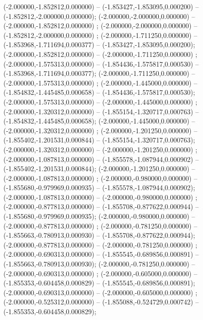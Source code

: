  (-2.000000,-1.852812,0.000000) -- (-1.853427,-1.853095,0.000200) -- (-1.852812,-2.000000,0.000000);
 (-2.000000,-2.000000,0.000000) -- (-2.000000,-1.852812,0.000000) ;
 (-2.000000,-2.000000,0.000000) -- (-1.852812,-2.000000,0.000000) ;
 (-2.000000,-1.711250,0.000000) -- (-1.853968,-1.711694,0.000377) -- (-1.853427,-1.853095,0.000200);
 (-2.000000,-1.852812,0.000000) -- (-2.000000,-1.711250,0.000000) ;
 (-2.000000,-1.575313,0.000000) -- (-1.854436,-1.575817,0.000530) -- (-1.853968,-1.711694,0.000377);
 (-2.000000,-1.711250,0.000000) -- (-2.000000,-1.575313,0.000000) ;
 (-2.000000,-1.445000,0.000000) -- (-1.854832,-1.445485,0.000658) -- (-1.854436,-1.575817,0.000530);
 (-2.000000,-1.575313,0.000000) -- (-2.000000,-1.445000,0.000000) ;
 (-2.000000,-1.320312,0.000000) -- (-1.855154,-1.320717,0.000763) -- (-1.854832,-1.445485,0.000658);
 (-2.000000,-1.445000,0.000000) -- (-2.000000,-1.320312,0.000000) ;
 (-2.000000,-1.201250,0.000000) -- (-1.855402,-1.201531,0.000844) -- (-1.855154,-1.320717,0.000763);
 (-2.000000,-1.320312,0.000000) -- (-2.000000,-1.201250,0.000000) ;
 (-2.000000,-1.087813,0.000000) -- (-1.855578,-1.087944,0.000902) -- (-1.855402,-1.201531,0.000844);
 (-2.000000,-1.201250,0.000000) -- (-2.000000,-1.087813,0.000000) ;
 (-2.000000,-0.980000,0.000000) -- (-1.855680,-0.979969,0.000935) -- (-1.855578,-1.087944,0.000902);
 (-2.000000,-1.087813,0.000000) -- (-2.000000,-0.980000,0.000000) ;
 (-2.000000,-0.877813,0.000000) -- (-1.855708,-0.877622,0.000944) -- (-1.855680,-0.979969,0.000935);
 (-2.000000,-0.980000,0.000000) -- (-2.000000,-0.877813,0.000000) ;
 (-2.000000,-0.781250,0.000000) -- (-1.855663,-0.780913,0.000930) -- (-1.855708,-0.877622,0.000944);
 (-2.000000,-0.877813,0.000000) -- (-2.000000,-0.781250,0.000000) ;
 (-2.000000,-0.690313,0.000000) -- (-1.855545,-0.689856,0.000891) -- (-1.855663,-0.780913,0.000930);
 (-2.000000,-0.781250,0.000000) -- (-2.000000,-0.690313,0.000000) ;
 (-2.000000,-0.605000,0.000000) -- (-1.855353,-0.604458,0.000829) -- (-1.855545,-0.689856,0.000891);
 (-2.000000,-0.690313,0.000000) -- (-2.000000,-0.605000,0.000000) ;
 (-2.000000,-0.525312,0.000000) -- (-1.855088,-0.524729,0.000742) -- (-1.855353,-0.604458,0.000829);
